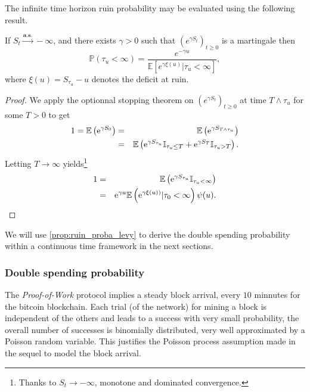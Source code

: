 The infinite time horizon ruin probability may be evaluated using the following result.
\begin{prop}\label{prop:ruin_proba_levy}
If $S_t\overset{\textbf{a.s.}}{\rightarrow} -\infty$, and there exists $\gamma>0$ such that $\left(e^{\gamma S_t}\right)_{t\geq0}$ is a martingale then
$$
\mathbb{P}(\tau_u<\infty)=\frac{e^{-\gamma u}}{\mathbb{E}\left[e^{\gamma \xi(u)}|\tau_u<\infty\right]},
$$
where $\xi(u)=S_{\tau_u}-u$ denotes the deficit at ruin.
\end{prop}
\begin{proof}
We apply the optionnal stopping theorem on $(e^{\gamma S_t})_{t\geq0}$ at time $T\land \tau_u$ for some $T>0$ to get 
\begin{eqnarray*}
1 = \mathbb{E}\left(\mathrm{e}^{\gamma S_0}\right)&=& \mathbb{E}\left(\mathrm{e}^{\gamma S_{T\land \tau_u}}\right)\\  
&=& \mathbb{E}\left(\mathrm{e}^{\gamma S_{\tau_u}}\mathbb{I}_{\tau_u\leq T} + \mathrm{e}^{\gamma S_{T}}\mathbb{I}_{\tau_u> T}\right).\\
\end{eqnarray*} 
Letting $T\rightarrow\infty$ yields\footnote{Thanks to $S_t\rightarrow -\infty$, monotone and dominated convergence.}
\begin{eqnarray*}
1 &=&\mathbb{E}\left(\mathrm{e}^{\gamma S_{\tau_u}}\mathbb{I}_{\tau_u<\infty}\right)\\
&=&\mathrm{e}^{\gamma u}\mathbb{E}\left(\mathrm{e}^{\gamma \xi(u))}|\tau_0<\infty\right)\psi(u).
\end{eqnarray*} 
\end{proof}
We will use \cref{prop:ruin_proba_levy} to derive the double spending probability within a continuous time framework in the next sections.
\subsubsection{Double spending probability}\label{sssec:double_spending_counting_process_dsp}
The \textit{Proof-of-Work} protocol implies a steady block arrival, every $10$ minnutes for the bitcoin blockchain. Each trial (of the network) for mining a block is independent of the others and leads to a success with very small probability, the overall number of successes is binomially distributed, very well approximated by a
Poisson random variable. This justifies the Poisson process assumption made in the sequel to model the block arrival.\\

